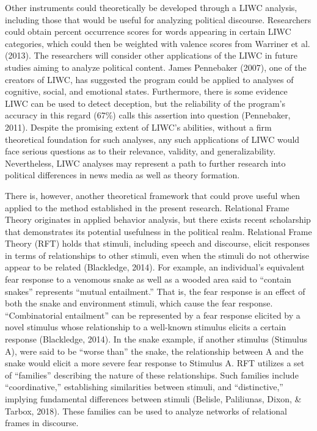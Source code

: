 \documentclass[english,,man]{apa6}
\begin{document}
Other instruments could theoretically be developed through a LIWC
analysis, including those that would be useful for analyzing political
discourse. Researchers could obtain percent occurrence scores for words
appearing in certain LIWC categories, which could then be weighted with
valence scores from Warriner et al. (2013). The researchers will
consider other applications of the LIWC in future studies aiming to
analyze political content. James Pennebaker (2007), one of the creators
of LIWC, has suggested the program could be applied to analyses of
cognitive, social, and emotional states. Furthermore, there is some
evidence LIWC can be used to detect deception, but the reliability of
the program's accuracy in this regard (67\%) calls this assertion into
question (Pennebaker, 2011). Despite the promising extent of LIWC's
abilities, without a firm theoretical foundation for such analyses, any
such applications of LIWC would face serious questions as to their
relevance, validity, and generalizability. Nevertheless, LIWC analyses
may represent a path to further research into political differences in
news media as well as theory formation.

There is, however, another theoretical framework that could prove useful
when applied to the method established in the present research.
Relational Frame Theory originates in applied behavior analysis, but
there exists recent scholarship that demonstrates its potential
usefulness in the political realm. Relational Frame Theory (RFT) holds
that stimuli, including speech and discourse, elicit responses in terms
of relationships to other stimuli, even when the stimuli do not
otherwise appear to be related (Blackledge, 2014). For example, an
individual's equivalent fear response to a venomous snake as well as a
wooded area said to \enquote{contain snakes} represents \enquote{mutual
entailment.} That is, the fear response is an effect of both the snake
and environment stimuli, which cause the fear response.
\enquote{Combinatorial entailment} can be represented by a fear response
elicited by a novel stimulus whose relationship to a well-known stimulus
elicits a certain response (Blackledge, 2014). In the snake example, if
another stimulus (Stimulus A), were said to be \enquote{worse than} the
snake, the relationship between A and the snake would elicit a more
severe fear response to Stimulus A. RFT utilizes a set of
\enquote{families} describing the nature of these relationships. Such
families include \enquote{coordinative,} establishing similarities
between stimuli, and \enquote{distinctive,} implying fundamental
differences between stimuli (Belisle, Paliliunas, Dixon, \& Tarbox,
2018). These families can be used to analyze networks of relational
frames in discourse.
\end{document}
